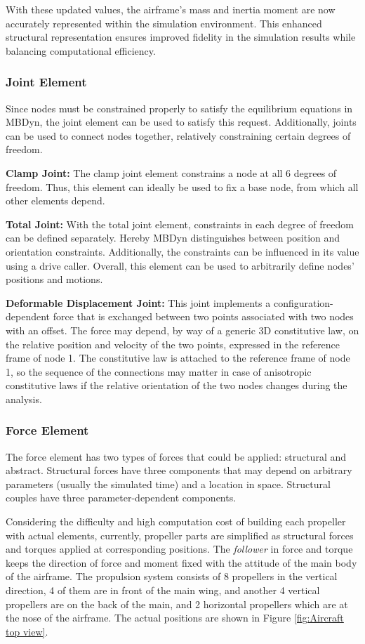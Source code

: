 With these updated values, the airframe's mass and inertia moment are now accurately represented within the simulation environment. This enhanced structural representation ensures improved fidelity in the simulation results while balancing computational efficiency.

\subsubsection{Joint Element}
Since nodes must be constrained properly to satisfy the equilibrium equations in MBDyn, the joint element can be used to satisfy this request. Additionally, joints can be used to connect nodes together, relatively constraining certain degrees of freedom.

\textbf{Clamp Joint:} The clamp joint element constrains a node at all 6 degrees of freedom. Thus, this element can ideally be used to fix a base node, from which all other elements depend.

\textbf{Total Joint:} With the total joint element, constraints in each degree of freedom can be defined separately. Hereby MBDyn distinguishes between position and orientation constraints. Additionally, the constraints can be influenced in its value using a drive caller. Overall, this element can be used to arbitrarily define nodes' positions and motions.

\textbf{Deformable Displacement Joint:} This joint implements a configuration-dependent force that is exchanged between two points associated with two nodes with an offset. The force may depend, by way of a generic 3D constitutive law, on the relative position and velocity of the two points, expressed in the reference frame of node 1. The constitutive law is attached to the reference frame of node 1, so the sequence of the connections may matter in case of anisotropic constitutive laws if the relative orientation of the two nodes changes during the analysis.

\subsubsection{Force Element}
\label{section:force elements}
The force element has two types of forces that could be applied: structural and abstract. Structural forces have three components that may depend on arbitrary parameters (usually the simulated time) and a location in space. Structural couples have three parameter-dependent components.

Considering the difficulty and high computation cost of building each propeller with actual elements, currently, propeller parts are simplified as structural forces and torques applied at corresponding positions. The \textit{follower} in force and torque keeps the direction of force and moment fixed with the attitude of the main body of the airframe. The propulsion system consists of 8 propellers in the vertical direction, 4 of them are in front of the main wing, and another 4 vertical propellers are on the back of the main, and 2 horizontal propellers which are at the nose of the airframe. The actual positions are shown in Figure \ref{fig:Aircraft top view}.

